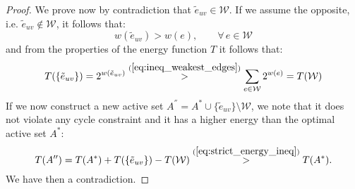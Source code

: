 \documentclass[12pt]{article}
\newcommand\TODO[1]{\fbox{\textcolor{red}{TODO: #1}}}
\begin{document}
\begin{proof}
We prove now by contradiction that $\tilde{e}_{uv} \in \mathcal{W}$. If we assume the opposite, i.e. $\tilde{e}_{uv} \notin \mathcal{W}$, it follows that:
\begin{equation}
w(\tilde{e}_{uv}) > w(e), \quad \quad \forall \,e\in \mathcal{W} \label{eq:ineq_weakest_edges}
\end{equation}
and from the properties of the energy function $T$ it follows that:
\begin{equation}
T(\{\tilde{e}_{uv}\}) = 2^{w(\tilde{e}_{uv})} \overset{(\ref{eq:ineq_weakest_edges})}{>} \sum_{e \in \mathcal{W}} 2^{w(e)} = T( \mathcal{W} ) \label{eq:strict_energy_ineq}
\end{equation}
If we now construct a new active set $A^{''}=A^*\cup\{\tilde{e}_{uv}\} \setminus \mathcal{W}$, we note that it does not violate any cycle constraint and it has a higher energy than the optimal active set $A^*$:
\begin{equation}
T(A'') = T(A^*) + T(\{\tilde{e}_{uv}\}) - T( \mathcal{W} ) \overset{(\ref{eq:strict_energy_ineq})}{>}T(A^*).
\end{equation}
We have then a contradiction.

\end{proof}
\end{document}
